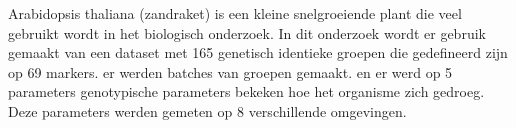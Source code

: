 \documentclass{article}
\author{Adriaan van der Graaf, Inne Lemstra}
\begin{document}
Arabidopsis thaliana (zandraket) is een kleine snelgroeiende plant die veel gebruikt wordt in het biologisch onderzoek.
In dit onderzoek wordt er gebruik gemaakt van een dataset met 165 genetisch identieke groepen die gedefineerd zijn op 69 markers.
er werden batches van groepen gemaakt. en er werd op 5 parameters genotypische parameters bekeken hoe het organisme zich gedroeg.
Deze parameters werden gemeten op 8 verschillende omgevingen.
\end{document}
